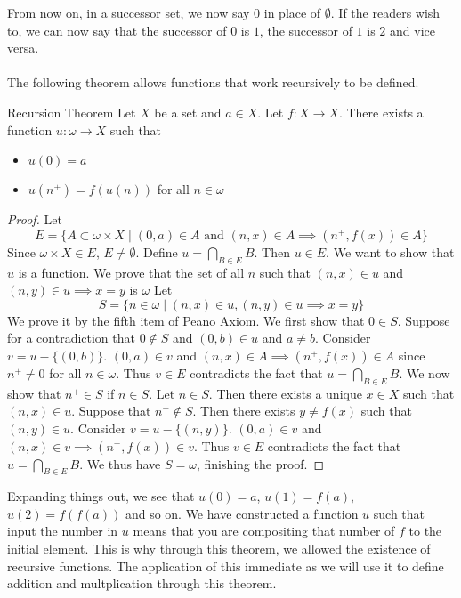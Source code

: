 \documentclass[a4paper]{article}
\begin{document}
From now on, in a successor set, we now say $0$ in place of $\emptyset$. If the readers wish to, we can now say that the successor of $0$ is $1$, the successor of $1$ is $2$ and vice versa. \\~\\

The following theorem allows functions that work recursively to be defined. 

\begin{thm}{Recursion Theorem}{} Let $X$ be a set and $a\in X$. Let $f:X\to X$. There exists a function $u:\omega\to X$ such that
\begin{itemize}
\item $u(0)=a$
\item $u(n^+)=f(u(n))$ for all $n\in\omega$
\end{itemize}\tcbline
\begin{proof} Let $$E=\{A\subset\omega\times X\;|\;(0,a)\in A\text{ and }(n,x)\in A\implies (n^+,f(x))\in A\}$$ Since $\omega\times X\in E$, $E\neq\emptyset$. Define $u=\bigcap_{B\in E}B$. Then $u\in E$. We want to show that $u$ is a function. We prove that the set of all $n$ such that $(n,x)\in u$ and $(n,y)\in u\implies x=y$ is $\omega$ Let $$S=\{n\in\omega\;|\;(n,x)\in u,(n,y)\in u\implies x=y\}$$ We prove it by the fifth item of Peano Axiom. \linebreak\linebreak
We first show that $0\in S$. Suppose for a contradiction that $0\notin S$ and $(0,b)\in u$ and $a\neq b$. Consider $v=u-\{(0,b)\}$. $(0,a)\in v$ and $(n,x)\in A\implies (n^+,f(x))\in A$ since $n^+\neq 0$ for all $n\in\omega$. Thus $v\in E$ contradicts the fact that $u=\bigcap_{B\in E}B$. \linebreak\linebreak
We now show that $n^+\in S$ if $n\in S$. Let $n\in S$. Then there exists a unique $x\in X$ such that $(n,x)\in u$. Suppose that $n^+\notin S$. Then there exists $y\neq f(x)$ such that $(n,y)\in u$. Consider $v=u-\{(n,y)\}$. $(0,a)\in v$ and $(n,x)\in v\implies (n^+,f(x))\in v$. Thus $v\in E$ contradicts the fact that $u=\bigcap_{B\in E}B$. We thus have $S=\omega$, finishing the proof. 
\end{proof}
\end{thm}

Expanding things out, we see that $u(0)=a$, $u(1)=f(a)$, $u(2)=f(f(a))$ and so on. We have constructed a function $u$ such that input the number in $u$ means that you are compositing that number of $f$ to the initial element. This is why through this theorem, we allowed the existence of recursive functions. The application of this immediate as we will use it to define addition and multplication through this theorem. 
\end{document}

